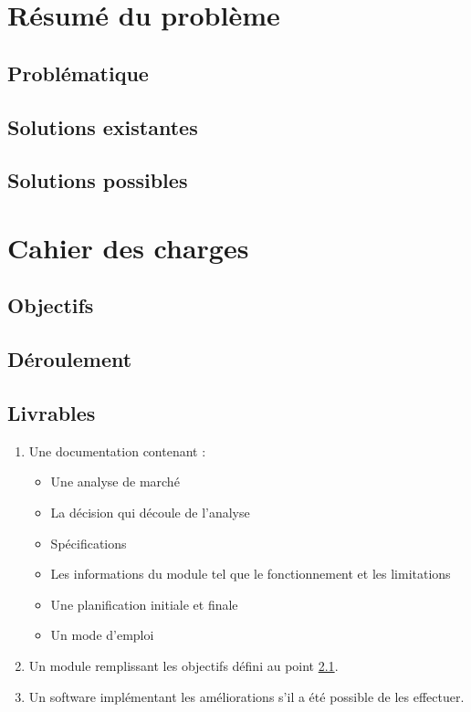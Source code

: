 \documentclass[../report]{subfiles}
\begin{document}
\section{Résumé du problème}
\lipsum[2]
\subsection{Problématique}
\lipsum[1]
\subsection{Solutions existantes}
\lipsum[1]
\subsection{Solutions possibles}
\lipsum[1]
\section{Cahier des charges}
\lipsum[2]
\subsection{Objectifs}\label{subsec:cdc-objectif}
\lipsum[1]
\subsection{Déroulement}
\lipsum[1]
\subsection{Livrables}
\lipsum[1]
\begin{enumerate}
  \item Une documentation contenant :
    \begin{itemize}
      \item Une analyse de marché
      \item La décision qui découle de l’analyse
      \item Spécifications
      \item Les informations du module tel que le fonctionnement et les limitations 
      \item Une planification initiale et finale
      \item Un mode d’emploi
    \end{itemize}
  \item Un module remplissant les objectifs défini au point \ref{subsec:cdc-objectif}.
  \item Un software implémentant les améliorations s’il a été possible de les effectuer.
\end{enumerate}
\end{document}
